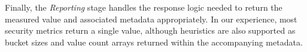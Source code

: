 

Finally, the \textit{Reporting} stage handles the response logic needed to return the measured value and associated metadata appropriately. In our experience, most security metrics return a single value, although heuristics are also supported as bucket sizes and value count arrays returned within the accompanying metadata. 